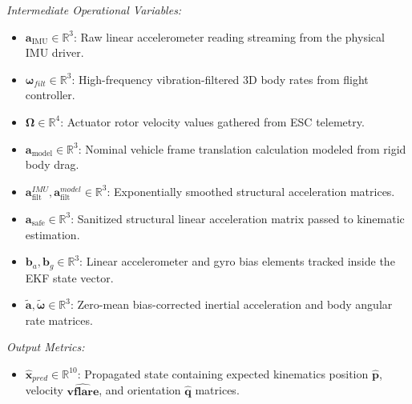 \documentclass{article}
\begin{document}
\noindent\textit{Intermediate Operational Variables:}
\begin{itemize}
    \item $\mathbf{a}_{\text{IMU}} \in \mathbb{R}^3$: Raw linear accelerometer reading streaming from the physical IMU driver.
    \item $\boldsymbol{\omega}_{filt} \in \mathbb{R}^3$: High-frequency vibration-filtered 3D body rates from flight controller.
    \item $\boldsymbol{\Omega} \in \mathbb{R}^4$: Actuator rotor velocity values gathered from ESC telemetry.
    \item $\mathbf{a}_{\text{model}} \in \mathbb{R}^3$: Nominal vehicle frame translation calculation modeled from rigid body drag.
    \item $\mathbf{a}_{\text{filt}}^{IMU}, \mathbf{a}_{\text{filt}}^{model} \in \mathbb{R}^3$: Exponentially smoothed structural acceleration matrices.
    \item $\mathbf{a}_{\text{safe}} \in \mathbb{R}^3$: Sanitized structural linear acceleration matrix passed to kinematic estimation.
    \item $\mathbf{b}_a, \mathbf{b}_g \in \mathbb{R}^3$: Linear accelerometer and gyro bias elements tracked inside the EKF state vector.
    \item $\tilde{\mathbf{a}}, \tilde{\boldsymbol{\omega}} \in \mathbb{R}^3$: Zero-mean bias-corrected inertial acceleration and body angular rate matrices.
\end{itemize}

\noindent\textit{Output Metrics:}
\begin{itemize}
    \item $\hat{\mathbf{x}}_{pred} \in \mathbb{R}^{10}$: Propagated state containing expected kinematics position $\hat{\mathbf{p}}$, velocity $\hat{\mathbf{v flare}}$, and orientation $\hat{\mathbf{q}}$ matrices.
\end{itemize}

\vspace{10pt}
\end{document}
